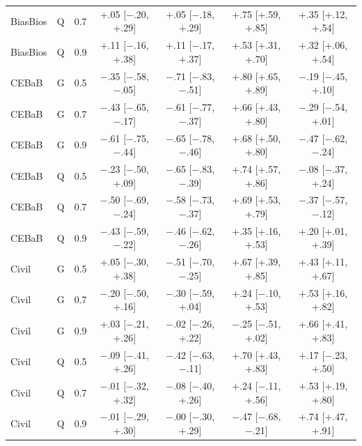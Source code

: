 \begin{tabular}{@{}lllcccc@{}}
BiasBios & Q & 0.7 & +.05 [$-$.20, +.29] & +.05 [$-$.18, +.29] & +.75 [+.59, +.85] & +.35 [+.12, +.54] \\
BiasBios & Q & 0.9 & +.11 [$-$.16, +.38] & +.11 [$-$.17, +.37] & +.53 [+.31, +.70] & +.32 [+.06, +.54] \\
CEBaB & G & 0.5 & $-$.35 [$-$.58, $-$.05] & $-$.71 [$-$.83, $-$.51] & +.80 [+.65, +.89] & $-$.19 [$-$.45, +.10] \\
CEBaB & G & 0.7 & $-$.43 [$-$.65, $-$.17] & $-$.61 [$-$.77, $-$.37] & +.66 [+.43, +.80] & $-$.29 [$-$.54, +.01] \\
CEBaB & G & 0.9 & $-$.61 [$-$.75, $-$.44] & $-$.65 [$-$.78, $-$.46] & +.68 [+.50, +.80] & $-$.47 [$-$.62, $-$.24] \\
CEBaB & Q & 0.5 & $-$.23 [$-$.50, +.09] & $-$.65 [$-$.83, $-$.39] & +.74 [+.57, +.86] & $-$.08 [$-$.37, +.24] \\
CEBaB & Q & 0.7 & $-$.50 [$-$.69, $-$.24] & $-$.58 [$-$.73, $-$.37] & +.69 [+.53, +.79] & $-$.37 [$-$.57, $-$.12] \\
CEBaB & Q & 0.9 & $-$.43 [$-$.59, $-$.22] & $-$.46 [$-$.62, $-$.26] & +.35 [+.16, +.53] & +.20 [+.01, +.39] \\
Civil & G & 0.5 & +.05 [$-$.30, +.38] & $-$.51 [$-$.70, $-$.25] & +.67 [+.39, +.85] & +.43 [+.11, +.67] \\
Civil & G & 0.7 & $-$.20 [$-$.50, +.16] & $-$.30 [$-$.59, +.04] & +.24 [$-$.10, +.53] & +.53 [+.16, +.82] \\
Civil & G & 0.9 & +.03 [$-$.21, +.26] & $-$.02 [$-$.26, +.22] & $-$.25 [$-$.51, +.02] & +.66 [+.41, +.83] \\
Civil & Q & 0.5 & $-$.09 [$-$.41, +.26] & $-$.42 [$-$.63, $-$.11] & +.70 [+.43, +.83] & +.17 [$-$.23, +.50] \\
Civil & Q & 0.7 & $-$.01 [$-$.32, +.32] & $-$.08 [$-$.40, +.26] & +.24 [$-$.11, +.56] & +.53 [+.19, +.80] \\
Civil & Q & 0.9 & $-$.01 [$-$.29, +.30] & $-$.00 [$-$.30, +.29] & $-$.47 [$-$.68, $-$.21] & +.74 [+.47, +.91] \\
\bottomrule
\end{tabular}
